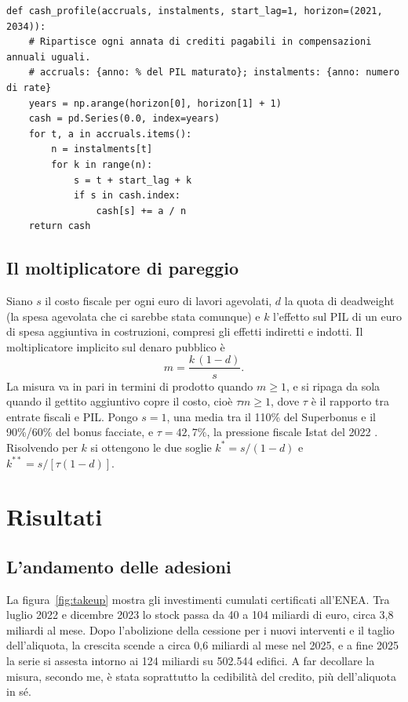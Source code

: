 \documentclass[11pt,a4paper]{article}
\begin{document}
\begin{lstlisting}
def cash_profile(accruals, instalments, start_lag=1, horizon=(2021, 2034)):
    # Ripartisce ogni annata di crediti pagabili in compensazioni annuali uguali.
    # accruals: {anno: % del PIL maturato}; instalments: {anno: numero di rate}
    years = np.arange(horizon[0], horizon[1] + 1)
    cash = pd.Series(0.0, index=years)
    for t, a in accruals.items():
        n = instalments[t]
        for k in range(n):
            s = t + start_lag + k
            if s in cash.index:
                cash[s] += a / n
    return cash
\end{lstlisting}

\subsection{Il moltiplicatore di pareggio}
Siano $s$ il costo fiscale per ogni euro di lavori agevolati, $d$ la quota di deadweight (la spesa agevolata che ci sarebbe stata comunque) e $k$ l'effetto sul PIL di un euro di spesa aggiuntiva in costruzioni, compresi gli effetti indiretti e indotti. Il moltiplicatore implicito sul denaro pubblico è
\begin{equation}
m=\frac{k\,(1-d)}{s}.
\end{equation}
La misura va in pari in termini di prodotto quando $m\ge 1$, e si ripaga da sola quando il gettito aggiuntivo copre il costo, cioè $\tau m\ge1$, dove $\tau$ è il rapporto tra entrate fiscali e PIL. Pongo $s=1$, una media tra il 110\% del Superbonus e il 90\%/60\% del bonus facciate, e $\tau=42,7\%$, la pressione fiscale Istat del 2022 \citep{istat2023conti}. Risolvendo per $k$ si ottengono le due soglie $k^{*}=s/(1-d)$ e $k^{**}=s/[\tau(1-d)]$.

\section{Risultati}
\subsection{L'andamento delle adesioni}
La figura~\ref{fig:takeup} mostra gli investimenti cumulati certificati all'ENEA. Tra luglio 2022 e dicembre 2023 lo stock passa da 40 a 104 miliardi di euro, circa 3,8 miliardi al mese. Dopo l'abolizione della cessione per i nuovi interventi e il taglio dell'aliquota, la crescita scende a circa 0,6 miliardi al mese nel 2025, e a fine 2025 la serie si assesta intorno ai 124 miliardi su 502.544 edifici. A far decollare la misura, secondo me, è stata soprattutto la cedibilità del credito, più dell'aliquota in sé.
\end{document}
